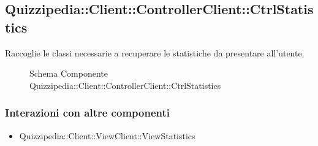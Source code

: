 \subsection{Quizzipedia::Client::ControllerClient::CtrlStatistics}
Raccoglie le classi necessarie a recuperare le statistiche da presentare all'utente.
\begin{figure}[H]
\centering
\noindent{}
\caption[Quizzipedia::Client::ControllerClient::CtrlStatistics]{Schema Componente Quizzipedia::Client::ControllerClient::CtrlStatistics}
\end{figure}
\subsubsection{Interazioni con altre componenti}
\begin{itemize}
\item Quizzipedia::Client::ViewClient::ViewStatistics
\end{itemize}
